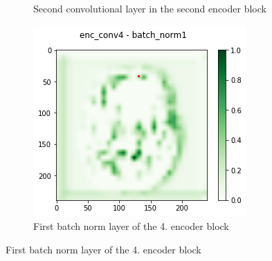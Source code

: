 \begin{figure}[H]
\begin{subfigure}{.33\textwidth}
        \caption{Second convolutional layer in the second encoder block}
    \end{subfigure}%
        \begin{subfigure}{.33\textwidth}
        \centering
        \includegraphics[width=\linewidth]{chapters/04_segmentation/images/grad_cam_14.png}
        \caption{First batch norm layer of the 4. encoder block}
    \end{subfigure}


\end{figure}
